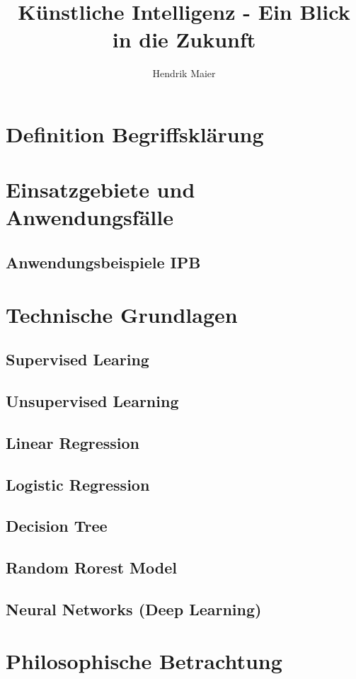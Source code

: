 \documentclass[12pt]{report}
\title{Künstliche Intelligenz - Ein Blick in die Zukunft}
\author{Hendrik Maier}
\date{}
\begin{document}
    \maketitle

    \section{Definition Begriffsklärung}
    \section{Einsatzgebiete und Anwendungsfälle}
    \subsection{Anwendungsbeispiele IPB}
    \section{Technische Grundlagen}
    \subsection{Supervised Learing}
    \subsection{Unsupervised Learning}
    \subsection{Linear Regression}
    \subsection{Logistic Regression}
    \subsection{Decision Tree}
    \subsection{Random Rorest Model}
    \subsection{Neural Networks (Deep Learning)}
    \section{Philosophische Betrachtung}
\end{document}
